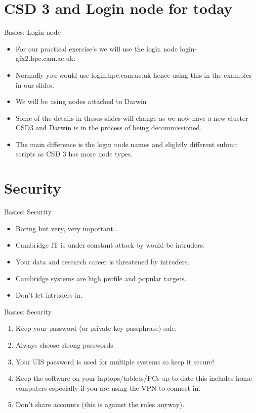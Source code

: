 \section{CSD 3 and Login node for today}
\begin{frame}{Basics: Login node}
\begin{itemize}
\item{\alert{For our practical exercise's we will use the login node login-gfx2.hpc.cam.ac.uk.}}
\pause
\item{Normally you would use login.hpc.cam.ac.uk hence using this in the examples in our slides.}
\pause
\item{We will be using nodes attached to Darwin}
\pause
\item{Some of the details in theses slides will change as we now have a new cluster CSD3 and Darwin is in the process of being decommissioned.}
\pause
\item{The main difference is the login node names and slightly different submit scripts as CSD 3 has more node types.}
\end{itemize}
\end{frame}

\section{Security}
\begin{frame}{Basics: Security}
\begin{itemize}
\item{\alert{Boring but very, very important${}\ldots$}}
\pause
\item{Cambridge IT is under constant attack by would-be intruders.}
\pause
\item{Your data and research career is threatened by intruders.}
\pause
\item{\alert{Cambridge systems} are high profile and popular targets.}
\pause
\item{\alert{Don't let intruders in.}}
\end{itemize}
\end{frame}

\begin{frame}{Basics: Security}
\begin{enumerate}
\item{\alert{Keep your password (or private key passphrase) safe.}}
\pause
\item{\alert{Always choose strong passwords.}}
\pause
\item{\alert{Your UIS password is used for multiple systems so keep it secure!}}
\pause
\item{Keep the software on your laptops/tablets/PCs up to date this includes home computers especially if you are using the VPN to connect in.}
\pause
\item{Don't share accounts (this is against the rules anyway).}
\end{enumerate}
\end{frame}

